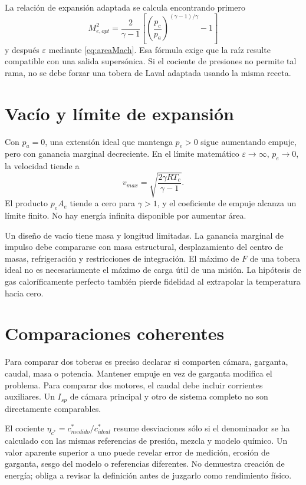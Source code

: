 La relación de expansión adaptada se calcula encontrando primero
\[
 M_{e,opt}^2=\frac{2}{\gamma-1}
 \left[\left(\frac{p_c}{p_a}\right)^{(\gamma-1)/\gamma}-1\right]
\]
y después $\varepsilon$ mediante \eqref{eq:areaMach}. Esa fórmula exige que la raíz resulte compatible con una salida supersónica. Si el cociente de presiones no permite tal rama, no se debe forzar una tobera de Laval adaptada usando la misma receta.
\section{Vacío y límite de expansión}
Con $p_a=0$, una extensión ideal que mantenga $p_e>0$ sigue aumentando empuje, pero con ganancia marginal decreciente. En el límite matemático $\varepsilon\to\infty$, $p_e\to0$, la velocidad tiende a
\[
 v_{max}=\sqrt{\frac{2\gamma RT_c}{\gamma-1}}.
\]
El producto $p_eA_e$ tiende a cero para $\gamma>1$, y el coeficiente de empuje alcanza un límite finito. No hay energía infinita disponible por aumentar área.

Un diseño de vacío tiene masa y longitud limitadas. La ganancia marginal de impulso debe compararse con masa estructural, desplazamiento del centro de masas, refrigeración y restricciones de integración. El máximo de $F$ de una tobera ideal no es necesariamente el máximo de carga útil de una misión. La hipótesis de gas caloríficamente perfecto también pierde fidelidad al extrapolar la temperatura hacia cero.
\section{Comparaciones coherentes}
Para comparar dos toberas es preciso declarar si comparten cámara, garganta, caudal, masa o potencia. Mantener empuje en vez de garganta modifica el problema. Para comparar dos motores, el caudal debe incluir corrientes auxiliares. Un $I_{sp}$ de cámara principal y otro de sistema completo no son directamente comparables.

El cociente $\eta_{c^*}=c^*_{medido}/c^*_{ideal}$ resume desviaciones sólo si el denominador se ha calculado con las mismas referencias de presión, mezcla y modelo químico. Un valor aparente superior a uno puede revelar error de medición, erosión de garganta, sesgo del modelo o referencias diferentes. No demuestra creación de energía; obliga a revisar la definición antes de juzgarlo como rendimiento físico.
